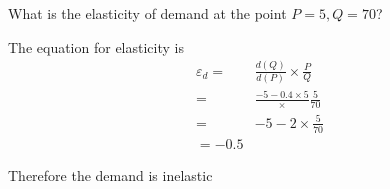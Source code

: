 \documentclass[12pt, a4paper, oneside]{article}\usepackage[]{graphicx}\usepackage[]{color}
\newenvironment{knitrout}{}{} %
\begin{document}
\begin{enumerate}
\begin{knitrout}
\end{knitrout}

What is the elasticity of demand at the point $P = 5, Q = 70$?

The equation for elasticity is 
\begin{align*}
\varepsilon_d =& \frac{d(Q)}{d(P)}\times \frac{P}{Q}\\
               =& \frac{-5 - 0.4 \times 5}\times \frac{5}{70}\\
              =& -5 -2 \times \frac{5}{70}\\
              = -0.5
\end{align*}

Therefore the demand is inelastic

\end{enumerate}
\end{document}
